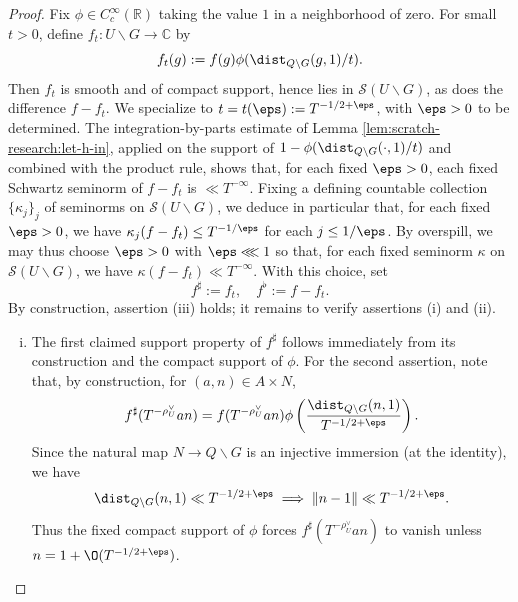 \begin{proof}
  Fix $\phi \in C_c^\infty(\mathbb{R})$ taking the value $1$ in a neighborhood of zero.  For small $t > 0$, define $f_t : U \backslash G \rightarrow \mathbb{C}$ by
  \begin{equation*}
    f_t(g) :=
    f(g) \phi (\dist_{Q \backslash G}(g,1) / t).
  \end{equation*}
  Then $f_t$ is smooth and of compact support, hence lies in $\mathcal{S}(U \backslash G)$, as does the difference $f - f_t$.  We specialize to $t = t(\eps) := T^{-1/2+\eps}$, with $\eps > 0$ to be determined.
  The integration-by-parts estimate of Lemma \ref{lem:scratch-research:let-h-in}, applied on the support of $1 - \phi(\dist_{Q \backslash G}(\cdot,1)/t)$ and combined with the product rule, shows that, for each fixed $\eps > 0$, each fixed Schwartz seminorm of $f - f_t$ is $\ll T^{-\infty}$.  Fixing a defining countable collection $\{\kappa_j\}_j$ of seminorms on $\mathcal{S}(U \backslash G)$, we deduce in particular that, for each fixed $\eps > 0$, we have $\kappa_j(f-f_t) \leq T^{-1/\eps}$ for each $j \leq 1/\eps$.  By overspill, we may thus choose $\eps > 0$ with $\eps \lll 1$ so that, for each fixed seminorm $\kappa$ on $\mathcal{S}(U \backslash G)$, we have $\kappa(f-f_t) \ll T^{-\infty}$.  With this choice, set
  \begin{equation*}
    f^\sharp := f_t,
    \quad
    f^\flat := f - f_t.
  \end{equation*}
  By construction, assertion (iii) holds; it remains to verify assertions (i) and (ii).
  \begin{enumerate}[(i)]
  \item The first claimed support property of $f^\sharp $ follows immediately from its construction and the compact support of $\phi$.  For the second assertion, note that, by construction, for $(a,n) \in A \times N$,
    \begin{equation}\label{eq:f-sharp-t}
      f^\sharp (T^{-\rho_U^\vee} a n) = f( T^{-\rho_U^\vee} a n) \phi\left(\frac{\dist_{Q \backslash G}(n,1) }{ T^{-1/2+\eps}}\right).
    \end{equation}
    Since the natural map $N \rightarrow Q \backslash G$ is an injective immersion (at the identity), we have
    \begin{equation*}
      \dist_{Q \backslash G} (n,1) \ll T^{-1/2+\eps} \implies \|n - 1\| \ll T^{-1/2 + \eps}.
    \end{equation*}
    Thus the fixed compact support of $\phi$ forces $f^\sharp (T^{- \rho_U^\vee } a n )$ to vanish unless $n = 1 + \O(T^{-1/2+\eps})$.


\end{enumerate}
\end{proof}
